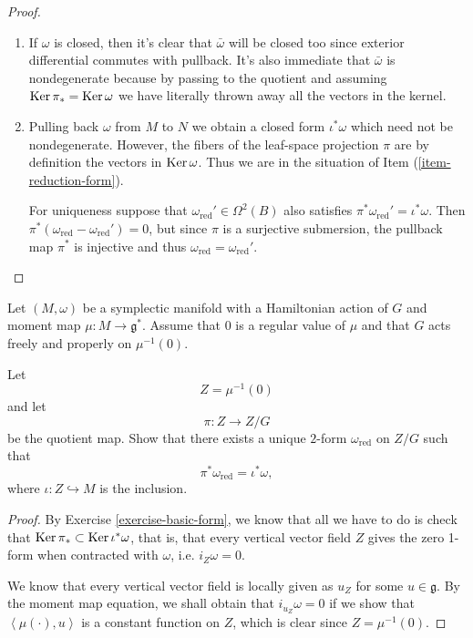 \begin{proof}
\begin{enumerate}
\item If $\omega$ is closed,
then it's clear that $\bar{\omega}$
will be closed too since exterior
differential commutes with pullback.
It's also immediate that
$\bar{\omega}$ is nondegenerate
because by passing to the quotient
and assuming $\mathop{\mathrm{Ker}}\pi_*=\mathop{\mathrm{Ker}}\omega$
we have literally thrown away
all the vectors in the kernel.

\item Pulling back $\omega$ from
$M$ to $N$ we obtain a closed form
$\iota^*\omega$ which need not be
nondegenerate.
However, the fibers of the leaf-space
projection $\pi$ are by definition
the vectors in $\mathop{\mathrm{Ker}} \omega$.
Thus we are in the situation
of Item (\ref{item-reduction-form}).

For uniqueness suppose
that $\omega_{\text{red}}' 
\in \Omega^2(B)$
also satisfies 
$\pi^*\omega_{\text{red}}'=\iota^*\omega$.
Then
$\pi^*(\omega_\text{red}-\omega_\text{red}')
=0$,
but since $\pi$ is a surjective
submersion, the pullback map $\pi^*$
is injective and thus
$\omega_\text{red}=\omega_\text{red}'$.
\end{enumerate}
\end{proof}

\begin{exercise}
\label{exercise-reduced-symplectic-form}
Let $(M,\omega)$ be a symplectic manifold
with a Hamiltonian action of $G$ and
moment map $\mu:M\to\mathfrak{g}^*$.
Assume that $0$ is a regular value of
$\mu$ and that $G$ acts freely and
properly on $\mu^{-1}(0)$.

Let
$$
Z=\mu^{-1}(0)
$$
and let
$$
\pi:Z\longrightarrow Z/G
$$
be the quotient map.
Show that there exists a unique $2$-form
$\omega_{\mathrm{red}}$ on $Z/G$ such that
$$
\pi^*\omega_{\mathrm{red}}
=
\iota^*\omega,
$$
where $\iota:Z\hookrightarrow M$ is the
inclusion.
\end{exercise}

\begin{proof}
By Exercise
\ref{exercise-basic-form},
we know that all we have to do is check that
$\mathop{\mathrm{Ker}} \pi_* \subset \mathop{\mathrm{Ker}} \iota^*\omega$,
that is, that every vertical vector field
$Z$ gives the zero 1-form when contracted
with $\omega$, i.e. $i_Z\omega=0$.

We know that every vertical vector field
is locally given as $u_Z$ for some
$u \in \mathfrak{g}$.
By the moment map equation,
we shall obtain that $i_{u_Z}\omega=0$
if we show that $\left\langle{}\mu(\cdot),u\right\rangle{}$
is a constant function on $Z$,
which is clear since $Z= \mu^{-1}(0)$.
\end{proof}

